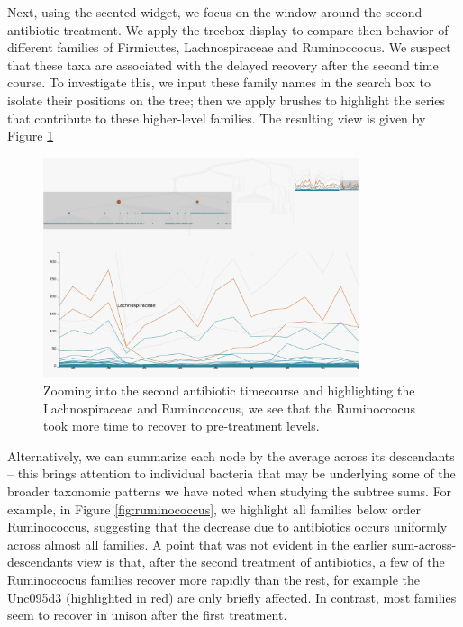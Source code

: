 \documentclass[12pt]{article}
\begin{document}
Next, using the scented widget, we focus on the window around the second
antibiotic treatment. We apply the treebox display to compare then
behavior of different families of Firmicutes, Lachnospiraceae and
Ruminoccocus. We suspect that these taxa are associated with the delayed
recovery after the second time course. To investigate this, we input
these family names in the search box to isolate their positions on the
tree; then we apply brushes to highlight the series that contribute to
these higher-level families. The resulting view is given by Figure
\ref{fig:antibioticfirmicutes}

\begin{figure}

{\centering \includegraphics[width=350px]{figure/antibiotic_firmicutes} 

}

\caption{Zooming into the second antibiotic timecourse and highlighting the Lachnospiraceae and Ruminococcus, we see that the Ruminoccocus took more time to recover to pre-treatment levels.}\label{fig:antibioticfirmicutes}
\end{figure}

Alternatively, we can summarize each node by the average across its
descendants -- this brings attention to individual bacteria that may be
underlying some of the broader taxonomic patterns we have noted when
studying the subtree sums. For example, in Figure
\ref{fig:ruminococcus}, we highlight all families below order
Ruminococcus, suggesting that the decrease due to antibiotics occurs
uniformly across almost all families. A point that was not evident in
the earlier sum-across-descendants view is that, after the second
treatment of antibiotics, a few of the Ruminoccocus families recover
more rapidly than the rest, for example the Unc095d3 (highlighted in
red) are only briefly affected. In contrast, most families seem to
recover in unison after the first treatment.
\end{document}
